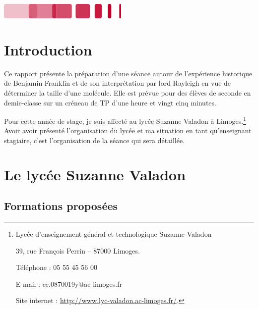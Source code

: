 \documentclass[12pt,a4paper]{article}
\begin{document}
\hfill
\includegraphics[scale=1]{logo_bottom.png}

\thispagestyle{empty}

\newpage

\tableofcontents
\newpage

\section*{Introduction}

Ce rapport présente la préparation d'une séance autour de l'expérience historique de Benjamin Franklin et de son interprétation par lord Rayleigh en vue de déterminer la taille d'une molécule.
Elle est prévue pour des élèves de seconde en demie-classe sur un créneau de TP d'une heure et vingt cinq minutes.

Pour cette année de stage, je suis affecté au lycée Suzanne Valadon à Limoges.\footnote{Lycée d'enseignement général et technologique Suzanne Valadon

39, rue François Perrin -- 87000 Limoges.

Téléphone : 05 55 45 56 00

E mail : ce.0870019y@ac-limoges.fr

Site internet : \href{http://www.lyc-valadon.ac-limoges.fr/}{http://www.lyc-valadon.ac-limoges.fr/}.}
Avoir avoir présenté l'organisation du lycée et ma situation en tant qu'enseignant stagiaire, c'est l'organisation de la séance qui sera détaillée.

\section{Le lycée Suzanne Valadon}

\subsection{Formations proposées}
\end{document}

